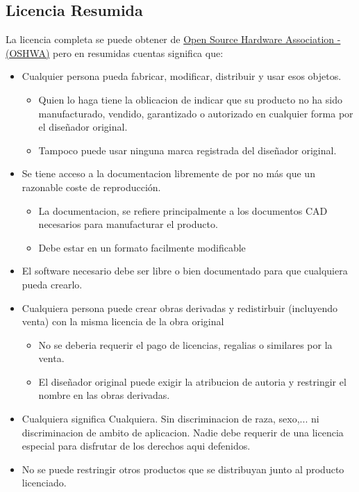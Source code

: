 \subsection{Licencia Resumida}
La licencia completa se puede obtener de \href{https://www.oshwa.org/definition/spanish/}{Open Source
Hardware Association - (OSHWA)} pero en resumidas cuentas significa que:
\begin{itemize}
    \item Cualquier persona pueda fabricar, modificar, distribuir y usar esos objetos.
    \begin{itemize}
        \item Quien lo haga tiene la oblicacion de indicar que su producto no ha sido
manufacturado, vendido, garantizado o autorizado en cualquier forma por el diseñador original.
        \item Tampoco puede usar ninguna marca registrada del diseñador original.
    \end{itemize}
    \item Se tiene acceso a la documentacion libremente de por no más que un razonable coste de reproducción.
    \begin{itemize}
        \item La documentacion, se refiere principalmente a los documentos CAD necesarios para manufacturar
        el producto.
        \item Debe estar en un formato facilmente modificable
    \end{itemize}
    \item El software necesario debe ser libre o bien
    documentado para que cualquiera pueda crearlo.
    \item Cualquiera persona puede crear obras derivadas y redistirbuir (incluyendo venta) con la misma licencia
de la obra original
    \begin{itemize}
        \item No se deberia requerir el pago de licencias, regalias o similares por la venta.
        \item El diseñador original puede exigir la atribucion de autoria y restringir el nombre en las obras
derivadas.
    \end{itemize}
    \item Cualquiera significa Cualquiera. Sin discriminacion de raza, sexo,... ni discriminacion de ambito
de aplicacion. Nadie debe requerir de una licencia especial para disfrutar de los derechos aqui defenidos.
    \item No se puede restringir otros productos que se distribuyan junto al producto licenciado. 

\end{itemize}

